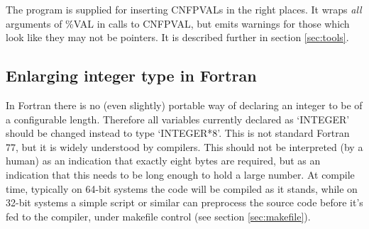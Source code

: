 \documentclass[twoside,11pt]{article}
\renewcommand{\_}{\texttt{\symbol{95}}}
\begin{document}
The program  is supplied for inserting CNF\_PVALs
in the right places.  It wraps {\em all\/} arguments of \%VAL 
in calls to CNF\_PVAL, but emits warnings for those which look like
they may not be pointers.  It is described further in section 
\ref{sec:tools}.


\subsection{Enlarging integer type in Fortran\label{sec:fint}}


In Fortran there is no (even slightly) portable way of declaring
an integer to be of a configurable length. 
Therefore all variables currently declared as `INTEGER' 
should be changed instead to type `INTEGER*8'. 
This is not standard Fortran 77, but it is widely understood by compilers.
This should not be interpreted (by a human) as an indication that exactly
eight bytes are required, but as an indication that this needs to be
long enough to hold a large number.
At compile time, typically on 64-bit systems the code will be compiled
as it stands, while on 32-bit systems a simple  script or similar
can preprocess the source code before it's fed to the compiler,
under makefile control (see section \ref{sec:makefile}).
\end{document}

